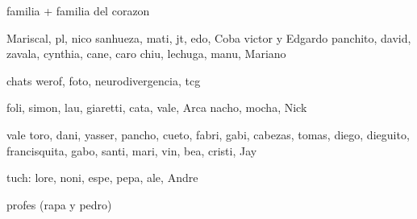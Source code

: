 familia + familia del corazon

Mariscal, pl, nico sanhueza, mati, jt, edo, Coba
victor y Edgardo
panchito, david, zavala, cynthia, cane, caro chiu, lechuga, manu, Mariano

chats werof, foto, neurodivergencia, tcg

foli, simon, lau, giaretti, cata, vale, Arca
nacho, mocha, Nick

vale toro, dani, yasser, pancho, cueto, fabri, gabi, cabezas, tomas, diego, dieguito, francisquita, gabo, santi, mari, vin, bea,
cristi, Jay

tuch: lore, noni, espe, pepa, ale, Andre

profes (rapa y pedro)

